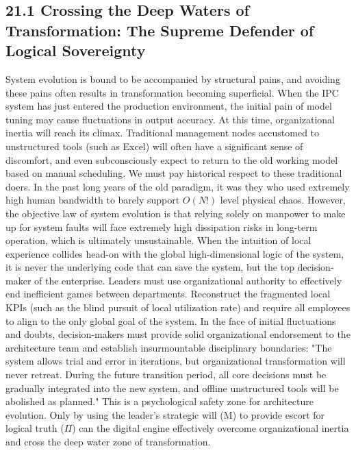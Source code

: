 \documentclass[11pt,a4paper]{article}
\begin{document}
\subsection*{21.1 Crossing the Deep Waters of Transformation: The Supreme Defender of Logical Sovereignty}


System evolution is bound to be accompanied by structural pains, and avoiding these pains often results in transformation becoming superficial. When the IPC system has just entered the production environment, the initial pain of model tuning may cause fluctuations in output accuracy. At this time, organizational inertia will reach its climax. Traditional management nodes accustomed to unstructured tools (such as Excel) will often have a significant sense of discomfort, and even subconsciously expect to return to the old working model based on manual scheduling. We must pay historical respect to these traditional doers. In the past long years of the old paradigm, it was they who used extremely high human bandwidth to barely support $O(N!)$ level physical chaos. However, the objective law of system evolution is that relying solely on manpower to make up for system faults will face extremely high dissipation risks in long-term operation, which is ultimately unsustainable. When the intuition of local experience collides head-on with the global high-dimensional logic of the system, it is never the underlying code that can save the system, but the top decision-maker of the enterprise. Leaders must use organizational authority to effectively end inefficient games between departments. Reconstruct the fragmented local KPIs (such as the blind pursuit of local utilization rate) and require all employees to align to the only global goal of the system. In the face of initial fluctuations and doubts, decision-makers must provide solid organizational endorsement to the architecture team and establish insurmountable disciplinary boundaries: "The system allows trial and error in iterations, but organizational transformation will never retreat. During the future transition period, all core decisions must be gradually integrated into the new system, and offline unstructured tools will be abolished as planned." This is a psychological safety zone for architecture evolution. Only by using the leader's strategic will (M) to provide escort for logical truth ($\Pi$) can the digital engine effectively overcome organizational inertia and cross the deep water zone of transformation.
\end{document}
